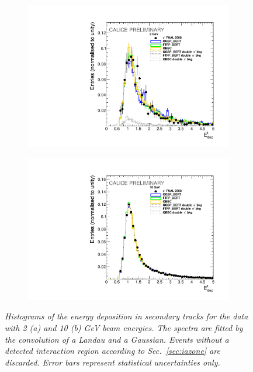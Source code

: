 \begin{figure}
	\centering
	\begin{subfigure}{0.5\textwidth}
		\centering
		\includegraphics[width=.90\linewidth]{ECAL/plots/calibrationfit-2.pdf}
		\caption{\label{fig:calib2} }
	\end{subfigure}%
	\begin{subfigure}{0.5\textwidth}
		\centering
		\includegraphics[width=.90\linewidth]{ECAL/plots/calibrationfit-10.pdf}
		\caption{\label{fig:calib10} }
	\end{subfigure}
	\caption{\label{fig:calib} \sl Histograms of the energy deposition in secondary tracks for the data with 2 (a) and 10 (b) GeV beam energies. The spectra are fitted by the convolution of a Landau and a Gaussian. Events without a detected interaction region according to Sec.~\ref{sec:iazone} are discarded. Error bars represent statistical uncertainties only.}
\end{figure}

